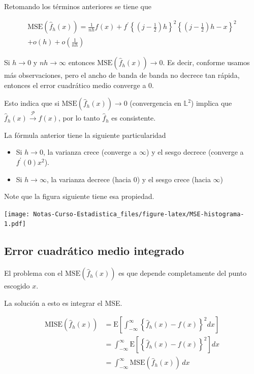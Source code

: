 \documentclass[
  12pt,
]{book}
\providecommand{\tightlist}{%
  \setlength{\itemsep}{0pt}\setlength{\parskip}{0pt}}
\theoremstyle{definition}
\theoremstyle{definition}
\theoremstyle{definition}
\theoremstyle{remark}
\let\BeginKnitrBlock\begin \let\EndKnitrBlock\end
\begin{document}
Retomando los términos anteriores se tiene que

\begin{multline*}
\mathrm{MSE}\left( \hat{f}_h(x)\right) =
\frac{1}{nh} f(x) + f^\prime
\left\{
\left(
j - \frac{1}{2}
\right) h
\right\}^2
\left\{
\left(
j - \frac{1}{2}
\right) h - x
\right\}^2 \\
+ o\left(h \right) +        o\left(\frac{1}{nh} \right)
\end{multline*}

\BeginKnitrBlock{remark}
{}Si \(h \to 0\) y \(nh \to \infty\) entonces \(\mathrm{MSE}\left( \hat{f}_h(x)\right) \to 0\). Es decir, conforme usamos más observaciones, pero el ancho de banda de banda no decrece tan rápida, entonces el error cuadrático medio converge a 0.

Esto indica que si \(\mathrm{MSE}\left( \hat{f}_h(x)\right) \to 0\) (convergencia en \(\mathbb{L}^2\)) implica que \(\hat{f}_h(x) \stackrel{\mathcal{P}}{\to} f(x)\), por lo tanto \(\hat{f}_h\) es consistente.
\EndKnitrBlock{remark}

La fórmula anterior tiene la siguiente particularidad

\begin{itemize}
\tightlist
\item
  Si \(h\to 0\), la varianza crece (converge a \(\infty\)) y el sesgo decrece (converge a \(f^\prime (0)x^2\)).
\item
  Si \(h\to \infty\), la varianza decrece (hacia 0) y el sesgo crece (hacia \(\infty\))
\end{itemize}

Note que la figura siguiente tiene esa propiedad.

\texttt{[image: Notas-Curso-Estadistica\_files/figure-latex/MSE-histograma-1.pdf]}

\hypertarget{error-cuadruxe1tico-medio-integrado}{%
\subsection{Error cuadrático medio integrado}\label{error-cuadruxe1tico-medio-integrado}}

El problema con el \(\mathrm{MSE}\left( \hat{f}_h(x)\right)\) es que depende completamente del punto escogido \(x\).

La solución a esto es integrar el MSE.

\begin{align*}
\mathrm{MISE}\left(  \hat{f}_h(x)\right)
& = \mathrm{E}\left[
\int_{ -\infty}^{\infty} \left\{
\hat{f}_h(x) - f(x)
\right\}^2 dx
\right]                                                       \\
& = \int_{ -\infty}^{\infty} \mathrm{E}\left[
\left\{
\hat{f}_h(x) - f(x)
\right\}^2
\right] dx                                                    \\
& = \int_{ -\infty}^{\infty}\mathrm{MSE}(\hat{f}_h(x)) \, dx
\end{align*}
\end{document}
